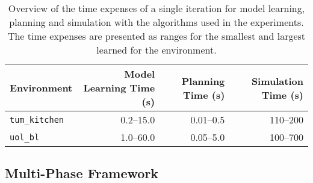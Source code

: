 \begin{table}[t!]
	\centering
	\caption{Overview of the time expenses of a single iteration for model learning, planning and simulation with the algorithms used in the experiments. The time expenses are presented as ranges for the smallest and largest  learned for the environment.}
	\label{tab:framework-time-expenses}
	\begin{tabular}{|l|r|r|r|}
		\hline
		\textbf{Environment}    & \textbf{Model Learning Time (\si{\second})} & \textbf{Planning Time (\si{\second})} & \textbf{Simulation Time (\si{\second})} \\ \hline
		\texttt{tum\_kitchen} & \numrange[range-phrase = --]{0.2}{15.0}       & \numrange[range-phrase = --]{0.01}{0.5} & \numrange[range-phrase = --]{110}{200}                         \\ \hline
		\texttt{uol\_bl}      & \numrange[range-phrase = --]{1.0}{60.0}       & \numrange[range-phrase = --]{0.05}{5.0}   & \numrange[range-phrase = --]{100}{700}                        \\ \hline
	\end{tabular}
\end{table}

\subsection{Multi-Phase Framework}
\label{sec:multiphase-framework-results}

